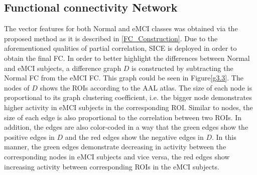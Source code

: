 \documentclass[journal]{IEEEtran}
\begin{document}
	
%
%	
	
	
	\subsection{Functional connectivity Network}
		The vector features for both Normal and eMCI classes was obtained via the proposed method as it is described in \eqref{FC_Construction}. Due to the aforementioned qualities of partial correlation, SICE is deployed in order to obtain the final FC.  
	In order to better highlight the differences between Normal and eMCI subjects, a difference graph $D$ is constructed by subtracting the Normal FC from the eMCI FC. This graph could be seen in Figure\eqref{g3.3}. 
	The nodes of $D$ shows the ROIs according to the AAL atlas. The size of each node is proportional to its graph clustering coefficient, i.e. the bigger node demonstrates higher activity in eMCI subjects in the corresponding ROI. 
	Similar to nodes, the size of each edge is also proportional to the correlation between two ROIs. In addition, the edges are also color-coded in a way that the green edges show the positive edges in $D$ and the red edges show the negative edges in $D$. In this manner, the green edges demonstrate decreasing in activity between the corresponding nodes in eMCI subjects and vice versa, the red edges show increasing activity between corresponding ROIs in the eMCI subjects.   
	
\end{document}
